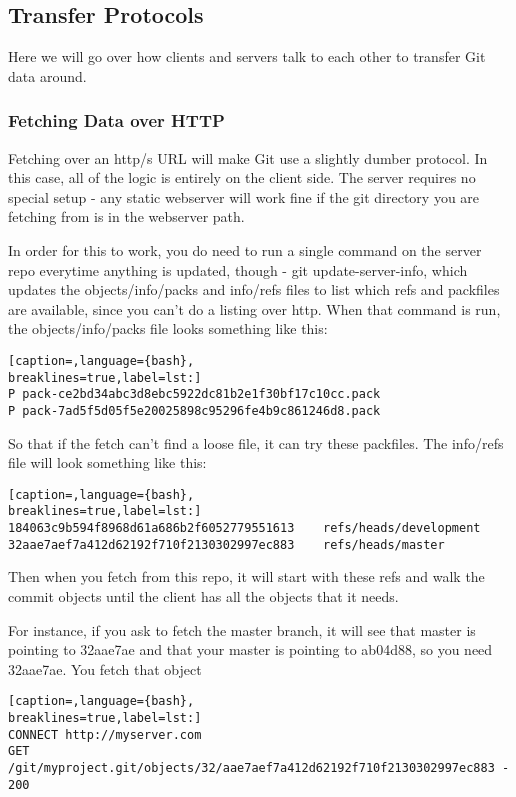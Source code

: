 \subsection{Transfer Protocols}
Here we will go over how clients and servers talk to each other to transfer Git
data around.

\subsubsection{Fetching Data over HTTP}
Fetching over an http/s URL will make Git use a slightly dumber protocol. In
this case, all of the logic is entirely on the client side. The server requires
no special setup - any static webserver will work fine if the git directory you
are fetching from is in the webserver path.

In order for this to work, you do need to run a single command on the server
repo everytime anything is updated, though - git update-server-info, which
updates the objects/info/packs and info/refs files to list which refs and
packfiles are available, since you can't do a listing over http. When that
command is run, the objects/info/packs file looks something like this:
\lstset{basicstyle=\scriptsize, numbers=none, captionpos=b, tabsize=4}
\begin{lstlisting}[caption=,language={bash},
breaklines=true,label=lst:]
P pack-ce2bd34abc3d8ebc5922dc81b2e1f30bf17c10cc.pack
P pack-7ad5f5d05f5e20025898c95296fe4b9c861246d8.pack
\end{lstlisting}

So that if the fetch can't find a loose file, it can try these packfiles. The
info/refs file will look something like this:
\lstset{basicstyle=\scriptsize, numbers=none, captionpos=b, tabsize=4}
\begin{lstlisting}[caption=,language={bash},
breaklines=true,label=lst:]
184063c9b594f8968d61a686b2f6052779551613    refs/heads/development
32aae7aef7a412d62192f710f2130302997ec883    refs/heads/master
\end{lstlisting}

Then when you fetch from this repo, it will start with these refs and walk the
commit objects until the client has all the objects that it needs.

For instance, if you ask to fetch the master branch, it will see that master is
pointing to 32aae7ae and that your master is pointing to ab04d88, so you need
32aae7ae. You fetch that object
\lstset{basicstyle=\scriptsize, numbers=none, captionpos=b, tabsize=4}
\begin{lstlisting}[caption=,language={bash},
breaklines=true,label=lst:]
CONNECT http://myserver.com
GET /git/myproject.git/objects/32/aae7aef7a412d62192f710f2130302997ec883 - 200
\end{lstlisting}

